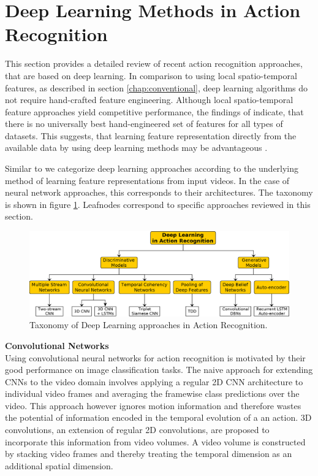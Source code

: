 \section{Deep Learning Methods in Action Recognition}
This section provides a detailed review of recent action recognition approaches, that are based on deep learning.
In comparison to using local spatio-temporal features, as described in section \ref{chap:conventional}, deep learning algorithms do not require hand-crafted feature engineering.
Although local spatio-temporal feature approaches yield competitive performance, the findings of \textcite{wang_evaluation_2009} indicate, that there is no universally best hand-engineered set of features for all types of datasets.
This suggests, that learning feature representation directly from the available data by using deep learning methods may be advantageous \cite{le_learning_2011}.

Similar to \cite{herath_going_2016} we categorize deep learning approaches according to the underlying method of learning feature representations from input videos.
In the case of neural network approaches, this corresponds to their architectures.
The taxonomy is shown in figure \ref{fig:deep_taxonomy}.
Leafnodes correspond to specific approaches reviewed in this section.

\begin{figure}[H]
    \centering
    \includegraphics[width=\textwidth]{img_deep/deep_taxonomy}
    \caption{Taxonomy of Deep Learning approaches in Action Recognition.}
    \label{fig:deep_taxonomy}
\end{figure}

\textbf{Convolutional Networks}\\
Using convolutional neural networks for action recognition is motivated by their good performance on image classification tasks.
The naive approach for extending CNNs to the video domain involves applying a regular 2D CNN architecture to individual video frames and averaging the framewise class predictions over the video.
This approach however ignores motion information and therefore wastes the potential of information encoded in the temporal evolution of a an action.
3D convolutions, an extension of regular 2D convolutions, are proposed to incorporate this information from video volumes.
A video volume is constructed by stacking video frames and thereby treating the temporal dimension as an additional spatial dimension.

